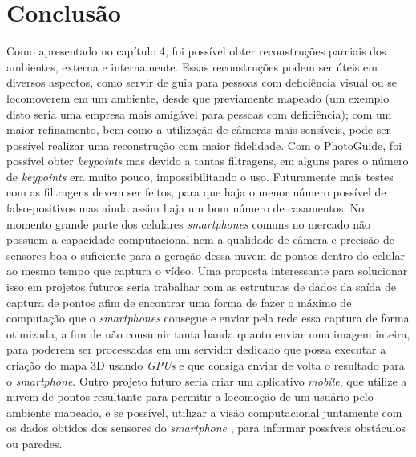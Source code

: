 \chapter{Conclusão}

Como apresentado no capítulo 4, foi possível obter reconstruções parciais dos ambientes, externa e internamente. Essas reconstruções podem ser úteis em diversos aspectos, como servir de guia para pessoas com deficiência visual ou se locomoverem em um ambiente, desde que previamente mapeado (um exemplo disto seria uma empresa mais amigável para pessoas com deficiência); com um maior refinamento, bem como a utilização de câmeras mais sensíveis, pode ser possível realizar uma reconstrução com maior fidelidade.
	Com o PhotoGuide, foi possível obter \textit{keypoints} mas devido a tantas filtragens, em alguns pares o número de \textit{keypoints} era muito pouco, impossibilitando o uso. Futuramente mais testes com as filtragens devem ser feitos, para que haja o menor número possível de falso-positivos mas ainda assim haja um bom número de casamentos. No momento grande parte dos celulares \textit{smartphones} comuns no mercado não possuem a capacidade computacional nem a qualidade de câmera e precisão de sensores boa o suficiente para a geração dessa nuvem de pontos dentro do celular ao mesmo tempo que captura o vídeo. Uma proposta interessante para solucionar isso em projetos futuros seria trabalhar com as estruturas de dados da saída de captura de pontos afim de encontrar uma forma de fazer o máximo de computação que o \textit{smartphones} consegue e enviar pela rede essa captura de forma otimizada, a fim de não consumir tanta banda quanto enviar uma imagem inteira, para poderem ser processadas em um servidor dedicado que possa executar a criação do mapa 3D usando \textit{GPUs} e que consiga enviar de volta o resultado para o \textit{smartphone}.
	Outro projeto futuro seria criar um aplicativo \textit{mobile}, que utilize a nuvem de pontos resultante para permitir a locomoção de um usuário pelo ambiente mapeado, e se possível, utilizar a visão computacional juntamente com os dados obtidos dos sensores do \textit{smartphone} , para informar possíveis obstáculos ou paredes.
